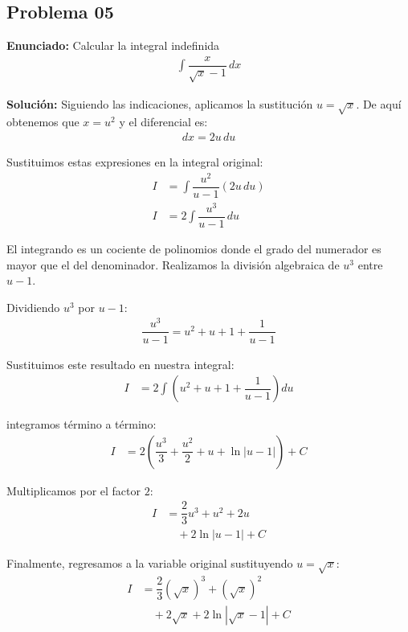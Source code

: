 \subsection*{Problema 05}

\textbf{Enunciado:} Calcular la integral indefinida
\begin{align*}
\int \dfrac{x}{\sqrt{x} - 1} \, dx
\end{align*}

\textbf{Solución:} Siguiendo las indicaciones, aplicamos la sustitución $u = \sqrt{x}$. 
De aquí obtenemos que $x = u^2$ y el diferencial es:
\begin{align*}
dx = 2u \, du
\end{align*}

Sustituimos estas expresiones en la integral original:
\begin{align*}
I &= \int \dfrac{u^2}{u - 1} (2u \, du) \\
I &= 2 \int \dfrac{u^3}{u - 1} \, du
\end{align*}

El integrando es un cociente de polinomios donde el grado del numerador es mayor que el del denominador. Realizamos la división algebraica de $u^3$ entre $u - 1$. 

Dividiendo $u^3$ por $u - 1$:
\begin{align*}
\dfrac{u^3}{u - 1} = u^2 + u + 1 + \dfrac{1}{u - 1}
\end{align*}

Sustituimos este resultado en nuestra integral:
\begin{align*}
I &= 2 \int \left( u^2 + u + 1 + \dfrac{1}{u - 1} \right) du
\end{align*}

integramos término a término:
\begin{align*}
I &= 2 \left( \dfrac{u^3}{3} + \dfrac{u^2}{2} + u + \ln|u - 1| \right) + C
\end{align*}

Multiplicamos por el factor $2$:
\begin{align*}
I &= \dfrac{2}{3}u^3 + u^2 + 2u \\
&\quad + 2\ln|u - 1| + C
\end{align*}

Finalmente, regresamos a la variable original sustituyendo $u = \sqrt{x}$:
\begin{align*}
I &= \dfrac{2}{3}(\sqrt{x})^3 + (\sqrt{x})^2 \\
&\quad + 2\sqrt{x} + 2\ln|\sqrt{x} - 1| + C
\end{align*}

